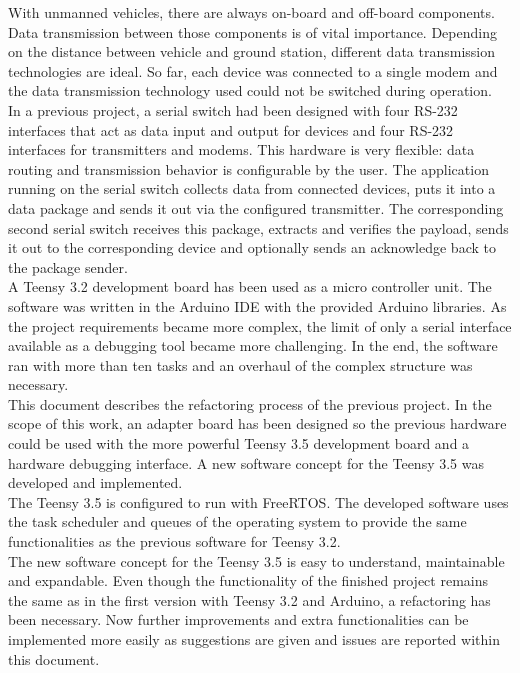 %
With unmanned vehicles, there are always on-board and off-board components. Data transmission between those components is of vital importance. Depending on the distance between vehicle and ground station, different data transmission technologies are ideal. So far, each device was connected to a single modem and the data transmission technology used could not be switched during operation.\\
In a previous project, a serial switch had been designed with four RS-232 interfaces that act as data input and output for devices and four RS-232 interfaces for transmitters and modems. This hardware is very flexible: data routing and transmission behavior is configurable by the user. The application running on the serial switch collects data from connected devices, puts it into a data package and sends it out via the configured transmitter. The corresponding second serial switch receives this package, extracts and verifies the payload, sends it out to the corresponding device and optionally sends an acknowledge back to the package sender.\\
A Teensy 3.2 development board has been used as a micro controller unit. The software was written in the Arduino IDE with the provided Arduino libraries. As the project requirements became more complex, the limit of only a serial interface available as a debugging tool became more challenging. In the end, the software ran with more than ten tasks and an overhaul of the complex structure was necessary.\\
This document describes the refactoring process of the previous project. In the scope of this work, an adapter board has been designed so the previous hardware could be used with the more powerful Teensy 3.5 development board and a hardware debugging interface. A new software concept for the Teensy 3.5 was developed and implemented.\\
The Teensy 3.5 is configured to run with FreeRTOS. The developed software uses the task scheduler and queues of the operating system to provide the same functionalities as the previous software for Teensy 3.2.\\
The new software concept for the Teensy 3.5 is easy to understand, maintainable and expandable. Even though the functionality of the finished project remains the same as in the first version with Teensy 3.2 and Arduino, a refactoring has been necessary. Now further improvements and extra functionalities can be implemented more easily as suggestions are given and issues are reported within this document.